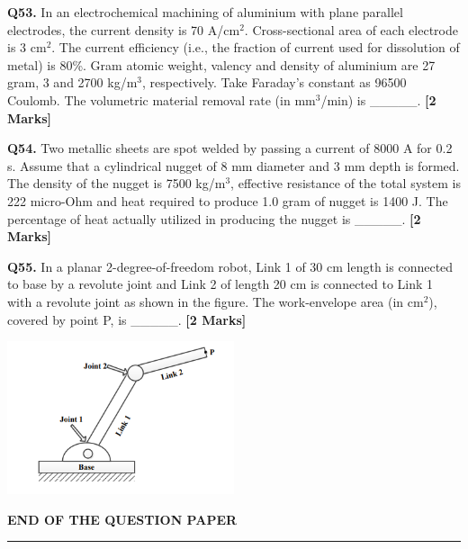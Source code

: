 \documentclass[11pt]{article}
\newcommand{\questionb}[2]{
    \noindent\textbf{Q#2.} #1 \hfill \textbf{[2 Marks]}
}
\begin{document}
\questionb{In an electrochemical machining of aluminium with plane parallel electrodes, the current density is 70 A/cm\(^2\). Cross-sectional area of each electrode is 3 cm\(^2\). The current efficiency (i.e., the fraction of current used for dissolution of metal) is 80\%. Gram atomic weight, valency and density of aluminium are 27 gram, 3 and 2700 kg/m\(^3\), respectively. Take Faraday’s constant as 96500 Coulomb. The volumetric material removal rate (in mm\(^3\)/min) is \_\_\_\_\_.}{53}
\vspace{0.5cm}

\questionb{Two metallic sheets are spot welded by passing a current of 8000 A for 0.2 s. Assume that a cylindrical nugget of 8 mm diameter and 3 mm depth is formed. The density of the nugget is 7500 kg/m\(^3\), effective resistance of the total system is 222 micro-Ohm and heat required to produce 1.0 gram of nugget is 1400 J. The percentage of heat actually utilized in producing the nugget is \_\_\_\_\_.}{54}
\vspace{0.5cm}

\questionb{In a planar 2-degree-of-freedom robot, Link 1 of 30 cm length is connected to base by a revolute joint and Link 2 of length 20 cm is connected to Link 1 with a revolute joint as shown in the figure. The work-envelope area (in cm\(^2\)), covered by point P, is \_\_\_\_\_.}{55}
\begin{center}
\includegraphics[width=0.5\textwidth]{figures/55.png}
\end{center}
\vspace{0.5cm}

\vspace{5cm}
\begin{center}
\textbf{END OF THE QUESTION PAPER}\\
\rule{\textwidth}{0.5pt} 
\end{center}
\end{document}
